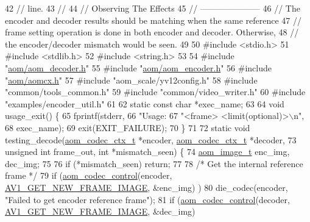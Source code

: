\begin{DoxyCodeInclude}
42 \textcolor{comment}{// line.}
43 \textcolor{comment}{//}
44 \textcolor{comment}{// Observing The Effects}
45 \textcolor{comment}{// ---------------------}
46 \textcolor{comment}{// The encoder and decoder results should be matching when the same reference}
47 \textcolor{comment}{// frame setting operation is done in both encoder and decoder. Otherwise,}
48 \textcolor{comment}{// the encoder/decoder mismatch would be seen.}
49 
50 \textcolor{preprocessor}{#include <stdio.h>}
51 \textcolor{preprocessor}{#include <stdlib.h>}
52 \textcolor{preprocessor}{#include <string.h>}
53 
54 \textcolor{preprocessor}{#include "\hyperlink{aom__decoder_8h}{aom/aom\_decoder.h}"}
55 \textcolor{preprocessor}{#include "\hyperlink{aom__encoder_8h}{aom/aom\_encoder.h}"}
56 \textcolor{preprocessor}{#include "\hyperlink{aomcx_8h}{aom/aomcx.h}"}
57 \textcolor{preprocessor}{#include "aom\_scale/yv12config.h"}
58 \textcolor{preprocessor}{#include "common/tools\_common.h"}
59 \textcolor{preprocessor}{#include "common/video\_writer.h"}
60 \textcolor{preprocessor}{#include "examples/encoder\_util.h"}
61 
62 \textcolor{keyword}{static} \textcolor{keyword}{const} \textcolor{keywordtype}{char} *exec\_name;
63 
64 \textcolor{keywordtype}{void} usage\_exit() \{
65   fprintf(stderr,
66           \textcolor{stringliteral}{"Usage: %
67           \textcolor{stringliteral}{"<frame> <limit(optional)>\(\backslash\)n"},
68           exec\_name);
69   exit(EXIT\_FAILURE);
70 \}
71 
72 \textcolor{keyword}{static} \textcolor{keywordtype}{void} testing\_decode(\hyperlink{structaom__codec__ctx}{aom\_codec\_ctx\_t} *encoder, 
      \hyperlink{structaom__codec__ctx}{aom\_codec\_ctx\_t} *decoder,
73                            \textcolor{keywordtype}{unsigned} \textcolor{keywordtype}{int} frame\_out, \textcolor{keywordtype}{int} *mismatch\_seen) \{
74   \hyperlink{structaom__image}{aom\_image\_t} enc\_img, dec\_img;
75 
76   \textcolor{keywordflow}{if} (*mismatch\_seen) \textcolor{keywordflow}{return};
77 
78   \textcolor{comment}{/* Get the internal reference frame */}
79   \textcolor{keywordflow}{if} (\hyperlink{group__codec_ga6da974f4eeaba1fa74106b28d0fe6ac5}{aom\_codec\_control}(encoder, \hyperlink{group__aom_gga9421a1fa78c0d9587ae5aa6c1cb3d659a410c706a34f5295996658cc5044a700f}{AV1\_GET\_NEW\_FRAME\_IMAGE}, &enc\_img)
      )
80     die\_codec(encoder, \textcolor{stringliteral}{"Failed to get encoder reference frame"});
81   \textcolor{keywordflow}{if} (\hyperlink{group__codec_ga6da974f4eeaba1fa74106b28d0fe6ac5}{aom\_codec\_control}(decoder, \hyperlink{group__aom_gga9421a1fa78c0d9587ae5aa6c1cb3d659a410c706a34f5295996658cc5044a700f}{AV1\_GET\_NEW\_FRAME\_IMAGE}, &dec\_img)
}
\end{DoxyCodeInclude}
